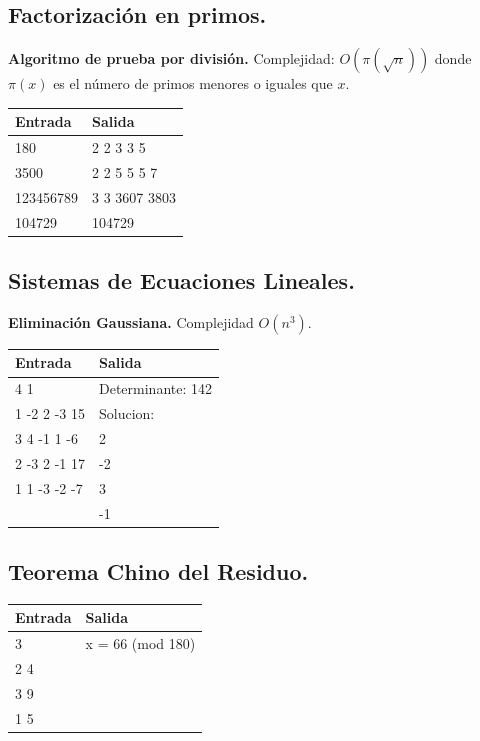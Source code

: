 \documentclass[12pt, letterpaper, twoside]{article}
\begin{document}
\subsection{Factorización en primos.}

\textbf{Algoritmo de prueba por división.} Complejidad: $O\left(\pi\left(\sqrt{n}\right)\right)$ donde $\pi(x)$ es el número de primos menores o iguales que $x$.



\begin{tabular}{|p{7cm}|p{7cm}|}
\hline
\textbf{Entrada} & \textbf{Salida}\\ \hline
180   & 2 2 3 3 5\\
3500  & 2 2 5 5 5 7\\ 
123456789 & 3 3 3607 3803\\
104729 & 104729\\ \hline
\end{tabular}\bigskip

\subsection{Sistemas de Ecuaciones Lineales.}

\textbf{Eliminación Gaussiana.} Complejidad $O(n^3)$.



\begin{tabular}{|p{7cm}|p{7cm}|}
\hline
\textbf{Entrada} & \textbf{Salida}\\ \hline
4 1          & Determinante: 142\\
1 -2 2 -3 15 & Solucion:\\ 
3 4 -1 1 -6  & 2\\ 
2 -3 2 -1 17 & -2\\ 
1 1 -3 -2 -7 & 3\\ 
             & -1\\ \hline
\end{tabular}\bigskip

\subsection{Teorema Chino del Residuo.}



\begin{tabular}{|p{7cm}|p{7cm}|}
\hline
\textbf{Entrada} & \textbf{Salida}\\ \hline
3   & x = 66 (mod 180)\\
2 4 & \\ 
3 9 & \\ 
1 5 & \\ \hline
\end{tabular}
\end{document}
